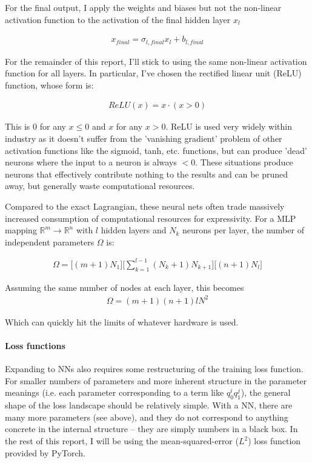 \documentclass[]{article}
\begin{document}
For the final output, I apply the weights and biases but not the non-linear activation function to the activation of the final hidden layer $x_l$

\begin{eqnarray*}
	x_{final}= \sigma_{l,final}  x_l + b_{l,final}
\end{eqnarray*}

For the remainder of this report, I'll stick to using the same non-linear activation function for all layers. In particular, I've chosen the rectified linear unit (ReLU) function, whose form is:

\begin{eqnarray*}
	ReLU(x) = x\cdot (x>0)
\end{eqnarray*}

This is 0 for any $x\leq0$ and $x$ for any $x>0$. ReLU is used very widely within industry as it doesn't suffer from the 'vanishing gradient' problem of other activation functions like the sigmoid, tanh, etc. functions, but can produce 'dead' neurons where the input to a neuron is always $<0$. These situations produce neurons that effectively contribute nothing to the results and can be pruned away, but generally waste computational resources. 

Compared to the exact Lagrangian, these neural nets often trade  massively increased consumption of computational resources for expressivity. For a MLP mapping $\mathbb{R}^m  \to \mathbb{R}^n$ with $l$ hidden layers and $N_k$ neurons per layer, the number of independent parameters $\Omega$ is:

\begin{eqnarray*}
	\Omega = \Big[ (m+1)N_1 \Big] \Big[\sum_{k=1}^{l-1} (N_k+1)N_{k+1}\Big] \Big[(n+1)N_{l}\Big]
\end{eqnarray*}

Assuming the same number of nodes at each layer, this becomes
\begin{eqnarray*}
	\Omega = (m+1)(n+1)lN^{2}
\end{eqnarray*}

Which can quickly hit the limits of whatever hardware is used.

\paragraph{Loss functions}

Expanding to NNs also requires some restructuring of the training loss function.  For smaller numbers of parameters and more inherent structure in the parameter meanings (i.e. each parameter corresponding to a term like $q_0^i q_1^j$), the general shape of the loss landscape should be relatively simple. With a NN, there are many more parameters (see above), and they do not correspond to anything concrete in the internal structure -- they are simply numbers in a black box. In the rest of this report, I will be using the mean-squared-error ($L^2$) loss function provided by PyTorch.
\end{document}
